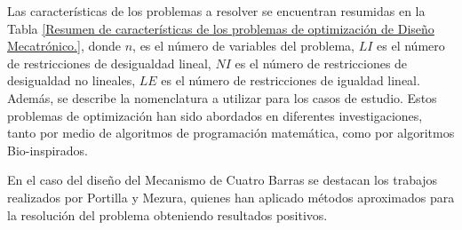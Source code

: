  Las características de los problemas a resolver se encuentran resumidas en la Tabla \ref{Resumen de características de los problemas de optimización de Diseño Mecatrónico.}, donde  $n$, es el número de variables del problema, $LI$ es el número de restricciones de desigualdad lineal, $NI$ es el número de restricciones de desigualdad no lineales,  $LE$ es el número de restricciones de igualdad lineal. Además, se describe la nomenclatura a utilizar para los casos de estudio. Estos problemas de optimización han sido abordados en diferentes investigaciones, tanto por medio de algoritmos de programación matemática, como por algoritmos Bio-inspirados.

\begin{table}
	\centering
	\caption{Resumen de características de los problemas de optimización de Diseño Mecatrónico.}
	\label{Resumen de características de los problemas de optimización de Diseño Mecatrónico.}
\end{table}


En el caso del  diseño del Mecanismo de Cuatro Barras se destacan los trabajos realizados por Portilla y Mezura, quienes han aplicado métodos aproximados para la resolución del problema obteniendo resultados positivos. 

